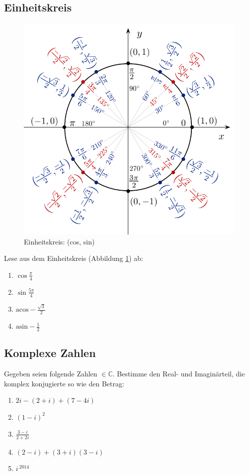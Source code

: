 \documentclass[11pt, a4paper]{article}
\newcommand{\acos}{\mathrm{acos}}
\newcommand{\asin}{\mathrm{asin}}
\begin{document}
\subsection{Einheitskreis}
\begin{figure}[h!]
	\centering
	\includegraphics[height=\textwidth]{Einheitskreis.png}
	\caption{Einheitskreis: (cos, sin)}
	\label{einheitskreis}
\end{figure}
Lese aus dem Einheitskreis (Abbildung \ref{einheitskreis}) ab:
\begin{enumerate}
	\item $\cos \frac{\pi}{4}$
	\item $\sin \frac{5\pi}{4}$
	\item $\acos -\frac{\sqrt{3}}{2}$
	\item $\asin -\frac{1}{2}$
\end{enumerate}

\subsection{Komplexe Zahlen}
Gegeben seien folgende Zahlen $\in \mathbb{C}$. Bestimme den Real- und Imaginärteil, die komplex konjugierte so wie den Betrag:
\begin{enumerate}
	\item $2i - (2 + i) + (7 - 4i)$
	\item $(1-i)^2$
	\item $\frac{3 - i}{2 + 2i}$
	\item $(2 - i) + (3 + i)(3-i)$
	\item $i^{\ 2014}$
\end{enumerate}
\end{document}
